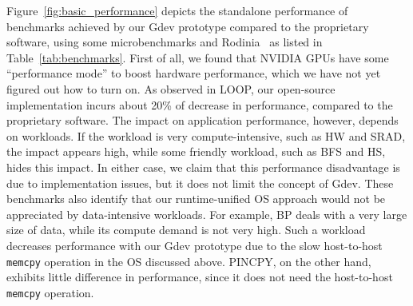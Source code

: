 Figure~\ref{fig:basic_performance} depicts the standalone performance of
benchmarks achieved by our Gdev prototype compared to the 
proprietary software, using some microbenchmarks and
Rodinia~\cite{Che_IISWC09} as listed in Table~\ref{tab:benchmarks}.
First of all, we found that NVIDIA GPUs have some ``performance mode''
to boost hardware performance, which we have not yet figured out how to
turn on.
As observed in LOOP, our open-source implementation incurs about 20\% of
decrease in performance, compared to the proprietary software.
The impact on application performance, however, depends on workloads.
If the workload is very compute-intensive, such as HW and SRAD, the
impact appears high, while some friendly workload, such as BFS and
HS, hides this impact.
In either case, we claim that this performance disadvantage is due to
implementation issues, but it does not limit the concept of Gdev.
These benchmarks also identify that our runtime-unified OS approach
would not be appreciated by data-intensive workloads.
For example, BP deals with a very large size of data, while its compute
demand is not very high.
Such a workload decreases performance with our Gdev prototype due to the
slow host-to-host \texttt{memcpy} operation in the OS discussed above.
PINCPY, on the other hand, exhibits little difference in
performance, since it does not need the host-to-host \texttt{memcpy}
operation.

